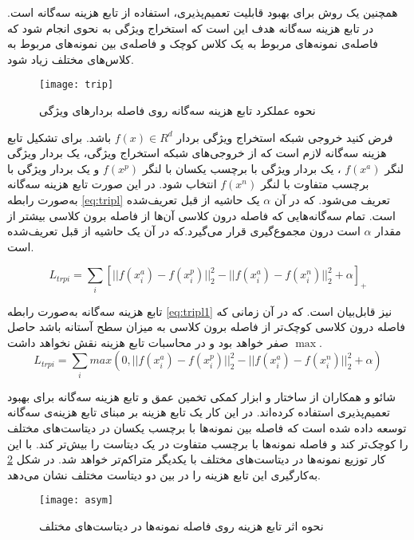 همچنین یک روش برای بهبود قابلیت تعمیم‌پذیری، استفاده از تابع هزینه سه‌گانه
\cite{schroff2015facenet}
است. در تابع هزینه سه‌گانه هدف این است که استخراج ویژگی به نحوی انجام شود که فاصله‌ی نمونه‌های مربوط به یک کلاس کوچک و فاصله‌ی بین نمونه‌های مربوط به کلاس‌های مختلف زیاد شود.
\begin{figure}[h]
	\centerline{\texttt{[image: trip]}}
	\caption{نحوه عملکرد تابع هزینه سه‌گانه روی فاصله بردارهای ویژگی \cite{schroff2015facenet} }
	\label{fig:trip}
\end{figure}

فرض کنید خروجی شبکه استخراج ویژگی بردار
$f(x) \in R^d$ 
 باشد. برای تشکیل تابع هزینه سه‌گانه لازم است که از خروجی‌های شبکه استخراج ویژگی، یک بردار ویژگی لنگر
$f(x^a)$ 
 ، یک بردار ویژگی با برچسب یکسان با لنگر
$f(x^p)$  
   و یک بردار ویژگی با برچسب متفاوت با لنگر 
$f(x^n)$ 
    انتخاب شود. در این صورت تابع هزینه سه‌گانه به‌صورت رابطه
\ref{eq:tripl}
 تعریف می‌شود. که در آن 
$\alpha$ 
  یک حاشیه از قبل تعریف‌شده است. تمام سه‌گانه‌هایی که فاصله درون کلاسی آن‌ها از فاصله برون کلاسی بیشتر از مقدار
$\alpha$
  است درون مجموع‌گیری قرار می‌گیرد.که در آن  یک حاشیه از قبل تعریف‌شده است.
 
 \begin{equation}\label{eq:tripl}
L_{trpi} = \sum_{i}{[||f(x_i^a)-f(x_i^p)||_2^2-||f(x_i^a)-f(x_i^n)||_2^2+\alpha]_+}
 \end{equation}

تابع هزینه سه‌گانه به‌صورت رابطه
\ref{eq:tripl1}
نیز قابل‌بیان است. که در آن زمانی که فاصله درون کلاسی کوچک‌تر از فاصله برون کلاسی به میزان سطح آستانه  باشد حاصل $\max$ صفر خواهد بود و در محاسبات تابع هزینه نقش نخواهد داشت.
 \begin{equation}\label{eq:tripl1}
	L_{trpi} = \sum_{i}{max(0,||f(x_i^a)-f(x_i^p)||_2^2-||f(x_i^a)-f(x_i^n)||_2^2+\alpha)}
\end{equation}

شائو و همکاران
\cite{shao2019multi}
از ساختار  و ابزار کمکی تخمین عمق و تابع هزینه سه‌گانه برای بهبود تعمیم‌پذیری استفاده کرده‌اند. در این کار یک تابع هزینه بر مبنای تابع هزینه‌ی سه‌گانه توسعه داده شده است که فاصله بین نمونه‌ها با برچسب یکسان در دیتاست‌های مختلف را کوچک‌تر کند و فاصله نمونه‌ها با برچسب متفاوت در یک دیتاست را بیش‌تر کند. با این کار توزیع نمونه‌ها در دیتاست‌های مختلف با یکدیگر متراکم‌تر خواهد شد. در شکل
\ref{fig:asym} 
به‌کارگیری این تابع هزینه را در بین دو دیتاست مختلف نشان می‌دهد.
\begin{figure}[h]
	\centerline{\texttt{[image: asym]}}
	\caption{نحوه اثر تابع هزینه روی فاصله نمونه‌ها در دیتاست‌های مختلف \cite{shao2019multi} }
	\label{fig:asym}
\end{figure}

